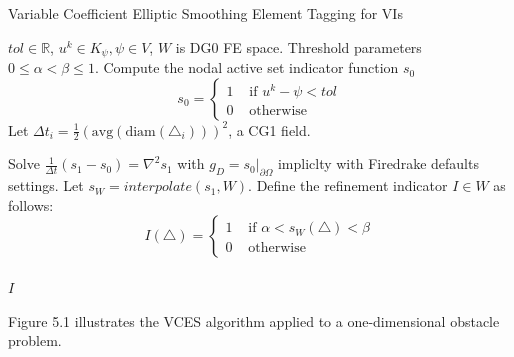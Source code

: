 \documentclass[]{interact}
\theoremstyle{plain}%
\theoremstyle{definition}
\theoremstyle{remark}
\begin{document}
\begin{algorithm}[H]
	\caption{Variable Coefficient Elliptic Smoothing Element Tagging for VIs}\label{alg:cap}
	\begin{algorithmic}[1]
		\Require $tol \in \mathbb{R}$, $u^k \in K_\psi, \psi \in V$, $W$ is DG0 FE space.
		\Require Threshold parameters $0\leq \alpha < \beta \leq 1$.
		\State Compute the nodal active set indicator function $s_0$
		  \begin{equation*}
			s_0 = \begin{cases}
			  1 & \text{ if } u^k - \psi < tol\\
			  0 & \text{ otherwise}
			\end{cases}
		  \end{equation*}
		\State Let $\Delta t_i = \frac{1}{2}(\text{avg}(\text{diam}(\triangle_i)))^2$, a CG1 field.
	  
		\State Solve $\frac{1}{\Delta t}(s_1 - s_0) = \nabla^2 s_1$ with $g_D = s_0|_{\partial\Omega}$ impliclty with Firedrake defaults settings. 
		\State Let $s_W = interpolate(s_1, W)$.
		\State Define the refinement indicator $I \in W$ as follows:
		\begin{equation*}
		  I(\triangle) = \begin{cases}
			1 & \text{ if } \alpha < s_W(\triangle) < \beta\\
			0 & \text{ otherwise}
		  \end{cases}
		\end{equation*}\\
		\Return $I$
	\end{algorithmic}
	\end{algorithm}

Figure 5.1 illustrates the VCES algorithm applied to a one-dimensional obstacle problem.
\end{document}
